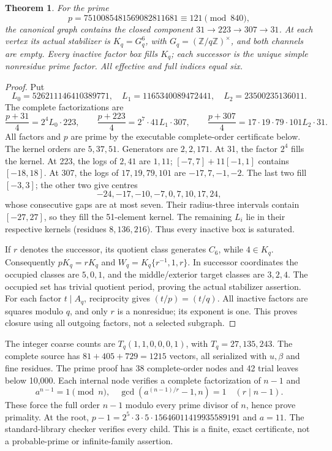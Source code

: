 \documentclass[11pt,reqno]{amsart}
\newtheorem{theorem}{Theorem}\newtheorem{lemma}[theorem]{Lemma}
\begin{document}
\begin{theorem}\label{tri}
For the prime
\[
 p=7510085481569082811681\equiv121\pmod{840},
\]
the canonical graph contains the closed component $31\to223\to307\to31$.
At each vertex its actual stabilizer is $K_q=G_q^6$, with
$G_q=(\mathbb Z/q\mathbb Z)^\times$, and both channels are empty. Every
inactive factor box fills $K_q$; each successor is the unique simple nonresidue
prime factor. All effective and full indices equal six.
\end{theorem}
\begin{proof}
Put
\[
 L_0=526211146410389771,\quad L_1=1165340089472441,\quad L_2=23500235136011.
\]
The complete factorizations are
\[
 \frac{p+31}{4}=2^4L_0\cdot223,\qquad
 \frac{p+223}{4}=2^7\cdot41L_1\cdot307,\qquad
 \frac{p+307}{4}=17\cdot19\cdot79\cdot101L_2\cdot31.       \tag{2}
\]
All factors and $p$ are prime by the executable complete-order certificate below.
The kernel orders are $5,37,51$. Generators are $2,2,171$.
At 31, the factor $2^4$ fills the kernel. At 223, the logs of $2,41$ are $1,11$;
$[-7,7]+11[-1,1]$ contains $[-18,18]$. At 307, the logs of $17,19,79,101$ are
$-17,7,-1,-2$. The last two fill $[-3,3]$; the other two give centres
\[
 -24,-17,-10,-7,0,7,10,17,24,
\]
whose consecutive gaps are at most seven. Their radius-three intervals contain
$[-27,27]$, so they fill the 51-element kernel. The remaining $L_i$ lie in their
respective kernels (residues $8,136,216$). Thus every inactive box is saturated.

If $r$ denotes the successor, its quotient class generates $C_6$, while $4\in K_q$.
Consequently $pK_q=rK_q$ and
$W_q=K_q\{r^{-1},1,r\}$. In successor coordinates the occupied classes are
$5,0,1$, and the middle/exterior target classes are $3,2,4$. The occupied set
has trivial quotient period, proving the actual stabilizer assertion.
For each factor $t\mid A_q$, reciprocity gives $(t/p)=(t/q)$. All inactive
factors are squares modulo $q$, and only $r$ is a nonresidue; its exponent is one.
This proves closure using all outgoing factors, not a selected subgraph.
\end{proof}

The integer coarse counts are $T_q(1,1,0,0,0,1)$, with $T_q=27,135,243$.
The complete source has $81+405+729=1215$ vectors, all serialized with $u,\beta$
and fine residues. The prime proof has 38 complete-order nodes and 42 trial leaves
below 10,000. Each internal node verifies a complete factorization of $n-1$ and
\[
 a^{n-1}=1\pmod n,\quad\gcd(a^{(n-1)/r}-1,n)=1\quad(r\mid n-1).
\]
These force the full order $n-1$ modulo every prime divisor of $n$, hence prove
primality. At the root, $p-1=2^5\cdot3\cdot5\cdot15646011419935589191$ and $a=11$.
The standard-library checker verifies every child. This is a finite, exact
certificate, not a probable-prime or infinite-family assertion.
\end{document}
